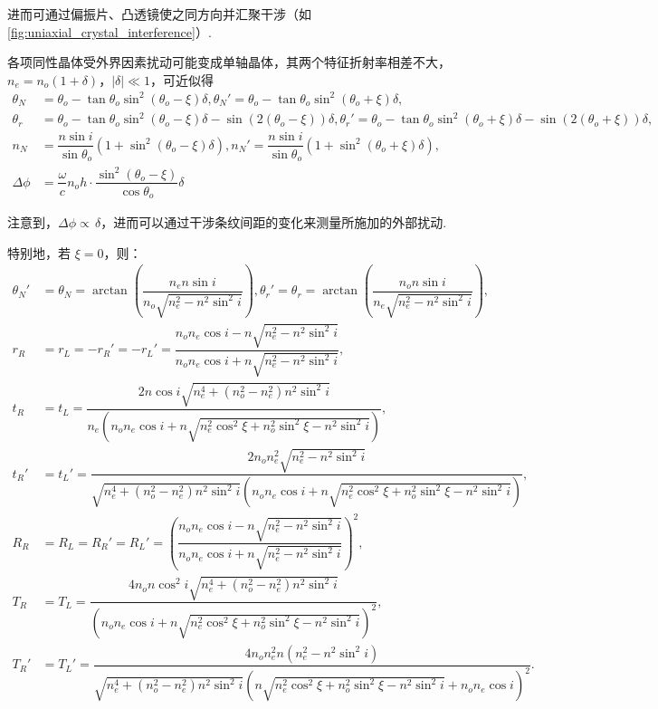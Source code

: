 进而可通过偏振片、凸透镜使之同方向并汇聚干涉（如\cref{fig:uniaxial_crystal_interference}）.

各项同性晶体受外界因素扰动可能变成单轴晶体，其两个特征折射率相差不大，\(n_e = n_o(1 + \delta)\)，\(|\delta| \ll 1\)，可近似得
\begin{align*}
	\theta_N   & = \theta_o - \tan\theta_o \sin^2(\theta_o - \xi) \delta,
	\theta_N' = \theta_o - \tan\theta_o \sin^2(\theta_o + \xi) \delta,                                     \\
	\theta_r   & = \theta_o - \tan\theta_o \sin^2(\theta_o - \xi) \delta - \sin(2(\theta_o - \xi)) \delta,
	\theta_r' = \theta_o - \tan\theta_o \sin^2(\theta_o + \xi) \delta - \sin(2(\theta_o + \xi)) \delta,    \\
	n_N        & = \dfrac{n \sin i}{\sin\theta_o} \left( 1 + \sin^2(\theta_o - \xi) \delta \right),
	n_N' = \dfrac{n \sin i}{\sin\theta_o} \left( 1 + \sin^2(\theta_o + \xi) \delta \right),                \\
	\Delta\phi & = \dfrac{\omega}{c} n_o h \cdot \dfrac{\sin^2(\theta_o - \xi)}{\cos\theta_o} \delta
\end{align*}

注意到，\(\Delta\phi\propto\,\delta\)，进而可以通过干涉条纹间距的变化来测量所施加的外部扰动.

特别地，若 \(\xi = 0\)，则：
\begin{align*}
	\theta_N' &= \theta_N = \arctan\left( \dfrac{n_e n \sin i}{n_o \sqrt{n_e^2 - n^2 \sin^2 i}} \right),
	\theta_r' = \theta_r = \arctan\left( \dfrac{n_o n \sin i}{n_e \sqrt{n_e^2 - n^2 \sin^2 i}} \right),\\
	r_R &= r_L = -r_R' = -r_L' = \dfrac{n_o n_e \cos i - n \sqrt{n_e^2 - n^2 \sin^2 i}}{n_o n_e \cos i + n \sqrt{n_e^2 - n^2 \sin^2 i}},\\
	t_R &= t_L = \dfrac{2 n \cos i \sqrt{n_e^4 + (n_o^2 - n_e^2) n^2 \sin^2 i}}{n_e \left( n_o n_e \cos i + n \sqrt{n_e^2 \cos^2\xi + n_o^2 \sin^2\xi - n^2 \sin^2 i} \right)},\\
	t_R' &= t_L' = \dfrac{2 n_o n_e^2 \sqrt{n_e^2 - n^2 \sin^2 i}}{\sqrt{n_e^4 + (n_o^2 - n_e^2) n^2 \sin^2 i} \left( n_o n_e \cos i + n \sqrt{n_e^2 \cos^2\xi + n_o^2 \sin^2\xi - n^2 \sin^2 i} \right)},\\
	R_R &= R_L = R_R' = R_L' = \left( \dfrac{n_o n_e \cos i - n \sqrt{n_e^2 - n^2 \sin^2 i}}{n_o n_e \cos i + n \sqrt{n_e^2 - n^2 \sin^2 i}} \right)^2,\\
	T_R &= T_L = \dfrac{4 n_o n \cos^2 i \sqrt{n_e^4 + (n_o^2 - n_e^2) n^2 \sin^2 i}}{\left( n_o n_e \cos i + n \sqrt{n_e^2 \cos^2\xi + n_o^2 \sin^2\xi - n^2 \sin^2 i} \right)^2},\\
	T_R' &= T_L' = \dfrac{4 n_o n_e^2 n (n_e^2 - n^2 \sin^2 i)}{\sqrt{n_e^4 + (n_o^2 - n_e^2) n^2 \sin^2 i} \left( n \sqrt{n_e^2 \cos^2\xi + n_o^2 \sin^2\xi - n^2 \sin^2 i} + n_o n_e \cos i \right)^2}.
\end{align*}


